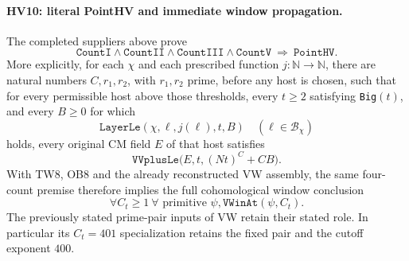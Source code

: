 \paragraph{HV10: literal PointHV and immediate window propagation.}
\label{claim:HV10}
The completed suppliers above prove
\[
 \boxed{\quad
 \mathtt{CountI}\wedge\mathtt{CountII}\wedge
 \mathtt{CountIII}\wedge\mathtt{CountV}
                    \ \Longrightarrow\ \mathtt{PointHV}.
 \quad}
 \tag{HV.41}
\]
More explicitly, for each $\chi$ and each prescribed function
$j:\mathbb N\to\mathbb N$, there are natural numbers
$C,r_1,r_2$, with $r_1,r_2$ prime, before any host is chosen,
such that for every permissible host above those thresholds,
every $t\ge2$ satisfying \texttt{Big}$(t)$, and every $B\ge0$
for which
\[
 \mathtt{LayerLe}(\chi,\ell,j(\ell),t,B)
                      \quad(\ell\in\mathcal B_\chi)
 \tag{HV.42}
\]
holds, every original CM field $E$ of that host satisfies
\[
                       \mathtt{VVplusLe}
                               \bigl(E,t,(Nt)^C+CB\bigr).
 \tag{HV.43}
\]
With TW8, OB8 and the already reconstructed VW assembly,
the same four-count premise therefore implies the full
cohomological window conclusion
\[
 \forall C_t\ge1\ \forall\text{ primitive }\psi,
                         \mathtt{VWinAt}(\psi,C_t).
 \tag{HV.44}
\]
The previously stated prime-pair inputs of VW retain their
stated role.  In particular its $C_t=401$ specialization
retains the fixed pair and the cutoff exponent $400$.

